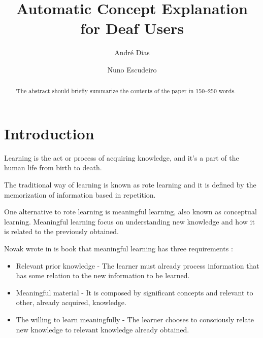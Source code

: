 \documentclass[runningheads]{llncs}
\begin{document}
%
\title{Automatic Concept Explanation for Deaf Users}
%
%
\author{André Dias \and
Nuno Escudeiro}
%
%
%
\maketitle              %
%
\begin{abstract}
The abstract should briefly summarize the contents of the paper in
150--250 words.

\end{abstract}
%
%
%
\section{Introduction}

Learning is the act or process of acquiring knowledge, and it's a part of the human life from birth to death.

The traditional way of learning is known as rote learning and it is defined by the memorization of information based in repetition.

One alternative to rote learning is meaningful learning, also known as conceptual learning.
Meaningful learning focus on understanding new knowledge and how it is related to the previously obtained.

Novak \cite{novak_2012} wrote in is book that meaningful learning has three requirements :

\begin{itemize}
    \item Relevant prior knowledge - The learner must already process information that has some relation to the new information to be learned.
    \item Meaningful material - It is composed by significant concepts and relevant to other, already acquired, knowledge.
    \item The willing to learn meaningfully - The learner chooses to consciously relate new knowledge to relevant knowledge already obtained.
\end{itemize}
\end{document}
